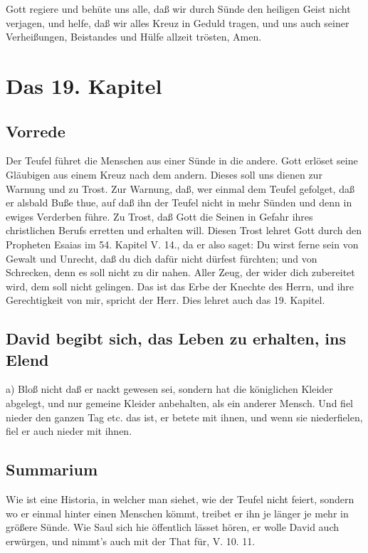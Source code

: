 Gott regiere und behüte uns alle, daß wir durch Sünde den heiligen Geist nicht verjagen, und helfe, daß wir alles Kreuz in Geduld tragen, und uns auch seiner Verheißungen, Beistandes und Hülfe allzeit trösten, Amen.

\chapter{Das 19. Kapitel}

\section{Vorrede}

Der Teufel führet die Menschen aus einer Sünde in die andere. Gott erlöset seine Gläubigen aus einem Kreuz nach dem andern. Dieses soll uns dienen zur Warnung und zu Trost. Zur Warnung, daß, wer einmal dem Teufel gefolget, daß er alsbald Buße thue, auf daß ihn der Teufel nicht in mehr Sünden und denn in ewiges Verderben führe. Zu Trost, daß Gott die Seinen in Gefahr ihres christlichen Berufs erretten und erhalten will. Diesen Trost lehret Gott durch den Propheten Esaias im 54. Kapitel V. 14., da er also saget: Du wirst ferne sein von Gewalt und Unrecht, daß du dich dafür nicht dürfest fürchten; und von Schrecken, denn es soll nicht zu dir nahen. Aller Zeug, der wider dich zubereitet wird, dem soll nicht gelingen. Das ist das Erbe der Knechte des Herrn, und ihre Gerechtigkeit von mir, spricht der Herr. Dies lehret auch das 19. Kapitel.

\section{David begibt sich, das Leben zu erhalten, ins Elend}

a) Bloß nicht daß er nackt gewesen sei, sondern hat die königlichen Kleider abgelegt, und nur gemeine Kleider anbehalten, als ein anderer Mensch. Und fiel nieder den ganzen Tag etc. das ist, er betete mit ihnen, und wenn sie niederfielen, fiel er auch nieder mit ihnen.

\section{Summarium}

Wie ist eine Historia, in welcher man siehet, wie der Teufel nicht feiert, sondern wo er einmal hinter einen Menschen kömmt, treibet er ihn je länger je mehr in größere Sünde. Wie Saul sich hie öffentlich lässet hören, er wolle David auch erwürgen, und nimmt's auch mit der That für, V. 10. 11.

